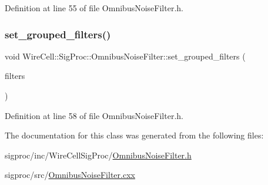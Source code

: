 Definition at line 55 of file Omnibus\+Noise\+Filter.\+h.

\mbox{\label{class_wire_cell_1_1_sig_proc_1_1_omnibus_noise_filter_ad4f98e813bc0067aef019484617c9440}} 
\subsubsection{\texorpdfstring{set\+\_\+grouped\+\_\+filters()}{set\_grouped\_filters()}}
{\footnotesize\ttfamily void Wire\+Cell\+::\+Sig\+Proc\+::\+Omnibus\+Noise\+Filter\+::set\+\_\+grouped\+\_\+filters (\begin{DoxyParamCaption}\item[{std\+::vector$<$ \hyperlink{class_wire_cell_1_1_i_component_a744b962ee9489c909f1b0f1fe2533798}{Wire\+Cell\+::\+I\+Channel\+Filter\+::pointer} $>$}]{filters }\end{DoxyParamCaption})\hspace{0.3cm}{\ttfamily [inline]}}



Definition at line 58 of file Omnibus\+Noise\+Filter.\+h.



The documentation for this class was generated from the following files\+:\begin{DoxyCompactItemize}
\item 
sigproc/inc/\+Wire\+Cell\+Sig\+Proc/\hyperlink{_omnibus_noise_filter_8h}{Omnibus\+Noise\+Filter.\+h}\item 
sigproc/src/\hyperlink{_omnibus_noise_filter_8cxx}{Omnibus\+Noise\+Filter.\+cxx}\end{DoxyCompactItemize}
